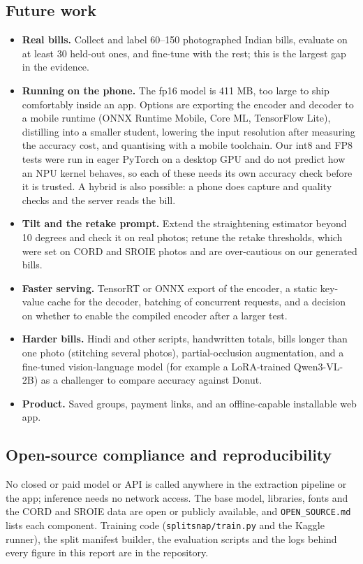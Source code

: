 \subsection*{Future work}
\begin{itemize}
\item \textbf{Real bills.} Collect and label 60--150 photographed Indian bills, evaluate on at least 30 held-out ones, and fine-tune with the rest; this is the largest gap in the evidence.
\item \textbf{Running on the phone.} The fp16 model is 411 MB, too large to ship comfortably inside an app. Options are exporting the encoder and decoder to a mobile runtime (ONNX Runtime Mobile, Core ML, TensorFlow Lite), distilling into a smaller student, lowering the input resolution after measuring the accuracy cost, and quantising with a mobile toolchain. Our int8 and FP8 tests were run in eager PyTorch on a desktop GPU and do not predict how an NPU kernel behaves, so each of these needs its own accuracy check before it is trusted. A hybrid is also possible: a phone does capture and quality checks and the server reads the bill.
\item \textbf{Tilt and the retake prompt.} Extend the straightening estimator beyond 10 degrees and check it on real photos; retune the retake thresholds, which were set on CORD and SROIE photos and are over-cautious on our generated bills.
\item \textbf{Faster serving.} TensorRT or ONNX export of the encoder, a static key-value cache for the decoder, batching of concurrent requests, and a decision on whether to enable the compiled encoder after a larger test.
\item \textbf{Harder bills.} Hindi and other scripts, handwritten totals, bills longer than one photo (stitching several photos), partial-occlusion augmentation, and a fine-tuned vision-language model (for example a LoRA-trained Qwen3-VL-2B) as a challenger to compare accuracy against Donut.
\item \textbf{Product.} Saved groups, payment links, and an offline-capable installable web app.
\end{itemize}

\subsection*{Open-source compliance and reproducibility}
No closed or paid model or API is called anywhere in the extraction pipeline or the app; inference needs no network access. The base model, libraries, fonts and the CORD and SROIE data are open or publicly available, and \texttt{OPEN\_SOURCE.md} lists each component. Training code (\texttt{splitsnap/train.py} and the Kaggle runner), the split manifest builder, the evaluation scripts and the logs behind every figure in this report are in the repository.
